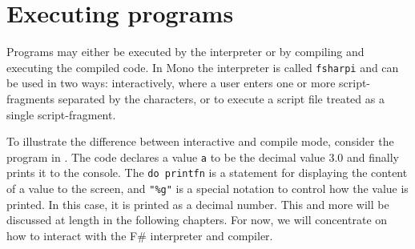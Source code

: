 \section{Executing programs}
Programs may either be executed by the interpreter or by compiling and executing the compiled code. In Mono the interpreter is called \lstinline[language=console]{fsharpi} and can be used in two ways: interactively, where a user enters one or more script-fragments separated by the \lexeme{;;} characters, or to execute a script file treated as a single script-fragment. 

To illustrate the difference between interactive and compile mode, consider the program in .
%
%
The code declares a value \lstinline{a} to be the decimal value 3.0 and finally prints it to the console. The \mbox{\lstinline{do printfn}} is a statement for displaying the content of a value to the screen, and \lstinline{"%g"} %
is a special notation to control how the value is printed. In this case, it is printed as a decimal number. This and more will be discussed at length in the following chapters. For now, we will concentrate on how to interact with the F\# interpreter and compiler.

